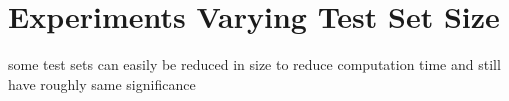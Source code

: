 \section{Experiments Varying Test Set Size}

some test sets can easily be reduced in size
to reduce computation time and still have roughly same significance 